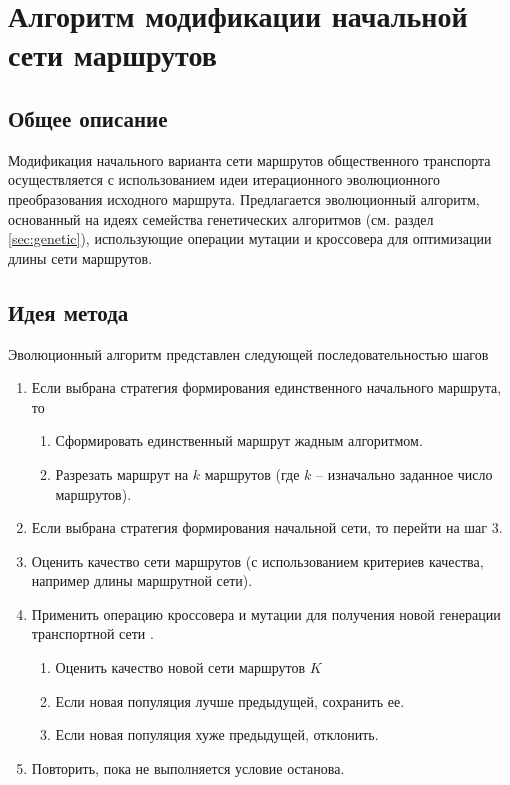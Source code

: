 \clearpage

\section{Алгоритм модификации начальной сети маршрутов}\label{sec:third-alg}
\subsection{Общее описание}
Модификация начального варианта сети маршрутов общественного транспорта осуществляется с использованием идеи 
итерационного эволюционного преобразования исходного маршрута. Предлагается эволюционный алгоритм, основанный 
на идеях семейства генетических алгоритмов (см. раздел \ref{sec:genetic}), использующие операции мутации и 
кроссовера для оптимизации длины сети маршрутов.

\subsection{Идея метода}
Эволюционный алгоритм представлен следующей последовательностью шагов
\begin{enumerate}
    \item Если выбрана стратегия формирования единственного начального маршрута, то 
    \begin{enumerate}
        \item Сформировать единственный маршрут жадным алгоритмом.
        \item Разрезать маршрут на \( k \) маршрутов (где \( k \) -- изначально заданное число 
            маршрутов).
    \end{enumerate}
    \item Если выбрана стратегия формирования начальной сети, то перейти на шаг 3.
    \item Оценить качество сети маршрутов (с использованием критериев качества, например длины 
        маршрутной сети).
    \item Применить операцию кроссовера и мутации для получения новой генерации транспортной 
        сети \cite{bib:20}.
    \begin{enumerate}
        \item Оценить качество новой сети маршрутов \( K \)
        \item Если новая популяция лучше предыдущей, сохранить ее.
        \item Если новая популяция хуже предыдущей, отклонить. 
    \end{enumerate}
    \item Повторить, пока не выполняется условие останова.
\end{enumerate}

